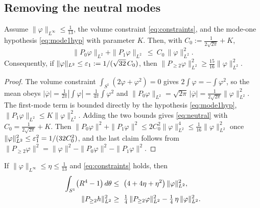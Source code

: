 \subsection{Removing the neutral modes}

\begin{lemma}\label{lem:modes}
Assume $\|\varphi\|_{L^\infty}\le\tfrac1{13}$, the volume constraint
\eqref{eq:constraints}, and the mode-one hypothesis \eqref{eq:mode1hyp} with
parameter $K$. Then, with $C_0:=\tfrac1{2\sqrt{2\pi}}+K$,
\begin{equation}\label{eq:neutral}
   \|P_0\varphi\|_{L^2}+\|P_1\varphi\|_{L^2}\ \le\ C_0\,\|\varphi\|_{L^2}^2 .
\end{equation}
Consequently, if $\|\varphi\|_{L^2}\le\varepsilon_1:=1/(\sqrt{32}\,C_0)$, then
$\|P_{\ge2}\varphi\|_{L^2}^2\ge\tfrac{15}{16}\|\varphi\|_{L^2}^2$.
\end{lemma}

\begin{proof}
The volume constraint $\int_{S^1}(2\varphi+\varphi^2)=0$ gives
$2\int\varphi=-\int\varphi^2$, so the mean obeys
$|\overline\varphi|=\tfrac1{2\pi}|\int\varphi|=\tfrac1{4\pi}\int\varphi^2$ and
$\|P_0\varphi\|_{L^2}=\sqrt{2\pi}\,|\overline\varphi|
=\tfrac1{2\sqrt{2\pi}}\|\varphi\|_{L^2}^2$. The first-mode term is bounded
directly by the hypothesis \eqref{eq:mode1hyp}, $\|P_1\varphi\|_{L^2}\le
K\|\varphi\|_{L^2}^2$. Adding the two bounds gives \eqref{eq:neutral} with
$C_0=\tfrac1{2\sqrt{2\pi}}+K$. Then
$\|P_0\varphi\|^2+\|P_1\varphi\|^2\le2C_0^2\|\varphi\|_{L^2}^4\le
\tfrac1{16}\|\varphi\|_{L^2}^2$ once $\|\varphi\|_{L^2}^2\le\varepsilon_1^2=
1/(32C_0^2)$, and the last claim follows from
$\|P_{\ge2}\varphi\|^2=\|\varphi\|^2-\|P_0\varphi\|^2-\|P_1\varphi\|^2$.
\end{proof}

\begin{lemma}\label{lem:taylor}
If $\|\varphi\|_{L^\infty}\le\eta\le\tfrac1{13}$ and \eqref{eq:constraints}
holds, then
\begin{align}
   \int_{S^1}\bigl(R^4-1\bigr)\,d\theta
      &\le\ \bigl(4+4\eta+\eta^2\bigr)\,\|\varphi\|_{L^2}^2 ,
      \label{eq:moment}\\
   \|P_{\ge2}h\|_{L^2}^2
      &\ge\ \tfrac14\,\|P_{\ge2}\varphi\|_{L^2}^2
            -\tfrac14\,\eta\,\|\varphi\|_{L^2}^2 .
      \label{eq:hlow}
\end{align}
\end{lemma}

